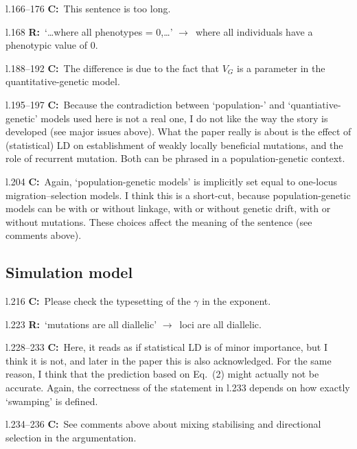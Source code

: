 \documentclass[11pt]{article}
\newenvironment{my_description}
{\begin{description}
  \setlength{\itemsep}{2pt}
  \setlength{\parskip}{0pt}
  \setlength{\parsep}{0pt}}
{\end{description}}
\newcommand{\ra}{$\rightarrow$\ }
\newcommand{\C}{\textbf{C:}\ }
\newcommand{\R}{\textbf{R:}\ }
\begin{document}
\begin{my_description}
	\item[l.166--176] \C This sentence is too long.
	\item[l.168] \R `\dots where all phenotypes = 0,\dots' \ra where all individuals have a phenotypic value of 0.
	\item[l.188--192] \C The difference is due to the fact that $V_G$ is a parameter in the quantitative-genetic model.
	\item[l.195--197] \C Because the contradiction between `population-' and `quantiative-genetic' models used here is not a real one, I do not like the way the story is developed (see major issues above). What the paper really is about is the effect of (statistical) LD on establishment of weakly locally beneficial mutations, and the role of recurrent mutation. Both can be phrased in a population-genetic context.
	\item[l.204] \C Again, `population-genetic models' is implicitly set equal to one-locus migration--selection models. I think this is a short-cut, because population-genetic models can be with or without linkage, with or without genetic drift, with or without mutations. These choices affect the meaning of the sentence (see comments above).
\end{my_description}



\subsection{Simulation model}

\begin{my_description}
	\item[l.216] \C Please check the typesetting of the $\gamma$ in the exponent.
	\item[l.223] \R `mutations are all diallelic' \ra loci are all diallelic.
	\item[l.228--233] \C Here, it reads as if statistical LD is of minor importance, but I think it is not, and later in the paper this is also acknowledged. For the same reason, I think that the prediction based on Eq.\ (2) might actually not be accurate. Again, the correctness of the statement in l.233 depends on how exactly `swamping' is defined.
	\item[l.234--236] \C See comments above about mixing stabilising and directional selection in the argumentation.
\end{my_description}
\end{document}
